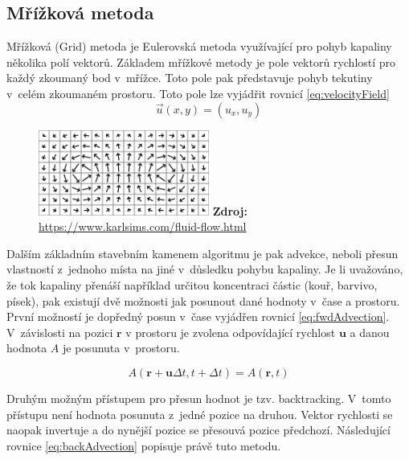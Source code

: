 \subsection{Mřížková metoda}
\label{chapter:Grid}
Mřížková (Grid) metoda je Eulerovská metoda využívající pro pohyb kapaliny několika polí vektorů. Základem mřížkové metody je pole vektorů rychlostí pro každý zkoumaný bod v~mřížce. Toto pole pak představuje pohyb tekutiny v~celém zkoumaném prostoru. Toto pole lze vyjádřit rovnicí \ref{eq:velocityField}
\begin{equation}
	\Vec{u}(x,y) = (u_x,u_y)
	\label{eq:velocityField}
\end{equation}

\begin{figure}[hbt]
	\captionsetup{justification=centering}
	\centering
	\includegraphics[width=0.5\textwidth]{obrazky-figures/flow-field.png}
	\textbf{Zdroj: } \url{https://www.karlsims.com/fluid-flow.html}
	\label{fig:VelocityField}
\end{figure}

Dalším základním stavebním kamenem algoritmu je pak advekce, neboli přesun vlastností z~jednoho místa na jiné v~důsledku pohybu kapaliny. Je li uvažováno, že tok kapaliny přenáší například určitou koncentraci částic (kouř, barvivo, písek), pak existují dvě možnosti jak posunout dané hodnoty v~čase a prostoru.  První možností je dopředný posun v~čase vyjádřen rovnicí \ref{eq:fwdAdvection}. V~závislosti na pozici $\mathbf{r}$ v prostoru je zvolena odpovídající rychlost $\mathbf{u}$ a danou hodnota $A$ je posunuta v~prostoru.

\begin{equation}
	A(\mathbf{r} + \mathbf{u}\Delta t, t + \Delta t) = A(\mathbf{r}, t)
	\label{eq:fwdAdvection}
\end{equation}

Druhým možným přístupem pro přesun hodnot je tzv. backtracking. V~tomto přístupu není hodnota posunuta z~jedné pozice na druhou. Vektor rychlosti se naopak invertuje a do nynější pozice se přesouvá pozice předchozí. Následující rovnice \ref{eq:backAdvection} popisuje právě tuto metodu. \cite{webglFluid}

